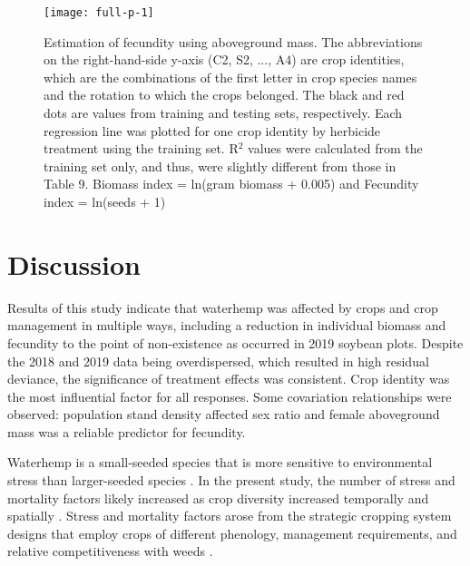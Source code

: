 \documentclass[
]{article}
\begin{document}
\begin{figure}[H]
\texttt{[image: full-p-1]} \caption{Estimation of fecundity using aboveground mass. The abbreviations on the right-hand-side y-axis (C2, S2, ..., A4) are crop identities, which are the combinations of the first letter in crop species names and the rotation to which the crops belonged. The black and red dots are values from training and testing sets, respectively. Each regression line was plotted for one crop identity by herbicide treatment using the training set. R$^2$ values were calculated from the training set only, and thus, were slightly different from those in Table 9. Biomass index = ln(gram biomass + 0.005) and Fecundity index = ln(seeds + 1)}\label{fig:full-p}
\end{figure}

\hypertarget{discussion}{%
\section*{Discussion}\label{discussion}}

Results of this study indicate that waterhemp was affected by crops and crop management in multiple ways, including a reduction in individual biomass and fecundity to the point of non-existence as occurred in 2019 soybean plots.
Despite the 2018 and 2019 data being overdispersed, which resulted in high residual deviance, the significance of treatment effects was consistent. Crop identity was the most influential factor for all responses. Some covariation relationships were observed: population stand density affected sex ratio and female aboveground mass was a reliable predictor for fecundity.

Waterhemp is a small-seeded species that is more sensitive to environmental stress than larger-seeded species \citep{harburLightGrowthRate2004}. In the present study, the number of stress and mortality factors likely increased as crop diversity increased temporally and spatially \citep{martinEffectCropRotation1993}. Stress and mortality factors arose from the strategic cropping system designs that employ crops of different phenology, management requirements, and relative competitiveness with weeds \citep{liebmanSustainableWeedManagement1990, liebmanCropRotationIntercropping1993}.
\end{document}
